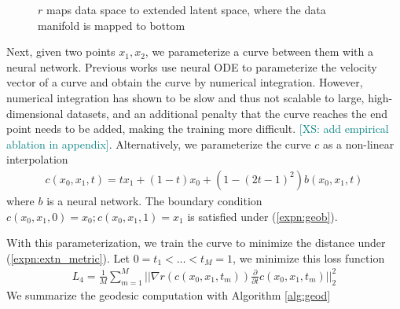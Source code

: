 \documentclass{article}
\theoremstyle{plain}
\theoremstyle{definition}
\theoremstyle{remark}
\newcommand{\xin}[1]{\textcolor{teal}{[XS: #1]}}
\begin{document}
\begin{figure}[htbp]
    \centering
    \caption{$r$ maps data space to extended latent space, where the data manifold is mapped to bottom}
    \label{fig:extn}
\end{figure}
\par Next, given two points $x_1,x_2$, we parameterize a curve between them with a neural network. Previous works \cite{fasina2023neural,huguet2022manifold} use neural ODE \cite{chen2018neural} to parameterize the velocity vector of a curve and obtain the curve by numerical integration. However, numerical integration has shown to be slow and thus not scalable to large, high-dimensional datasets, and an additional penalty that the curve reaches the end point needs to be added, making the training more difficult. \xin{add empirical ablation in appendix}. Alternatively, we parameterize the curve $c$ as a non-linear interpolation
\begin{align}
    c(x_0,x_1,t)=tx_1+(1-t)x_0+(1-(2t-1)^2)b(x_0,x_1,t)\label{expn:geob}
\end{align}
where $b$ is a neural network. The boundary condition $c(x_0,x_1,0)=x_0;c(x_0,x_1,1)=x_1$ is satisfied under (\ref{expn:geob}).
\par With this parameterization, we train the curve to minimize the distance under (\ref{expn:extn_metric}). Let $0=t_1<\dots<t_M=1$, we minimize this loss function
\begin{align}
    L_4=\frac{1}{M}\sum_{m=1}^{M}||\nabla r(c(x_0,x_1,t_m))\frac{\partial}{\partial t}c(x_0,x_1,t_m)||_2^2
\end{align}
We summarize the geodesic computation with Algorithm \ref{alg:geod}
\end{document}
